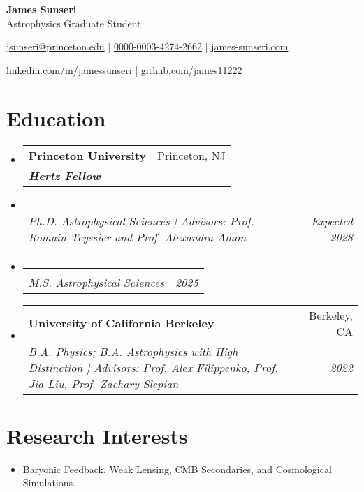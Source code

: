 \documentclass[letterpaper,10pt]{article}
\makeatletter
\newcommand{\resumeItemSimple}[2]{
  \item\small{
    \textbf{#1}{#2 \vspace{-3pt}}
  }
}
\newcommand{\resumeSubheading}[4]{
  \vspace{-1pt}\item[]
  \begin{tabular*}{0.98\textwidth}{l@{\extracolsep{\fill}}r}
      \hspace{-10pt}\textbf{#1} & #2 \\
      \hspace{-10pt}\textit{\small#3} & \textit{\small #4} \\
    \end{tabular*}\vspace{-3pt}
}
\newcommand{\resumeSubHeadingListStart}{\begin{itemize}[leftmargin=*]}
\newcommand{\resumeSubHeadingListEnd}{\end{itemize}}
\newcommand{\resumeItemListStart}{\begin{itemize}}
\newcommand{\shorterSection}[1]{\vspace{-10pt}\section{#1}}
\newcommand{\LinkedinLogo}{\textcolor{rgb:red,6;green,108;blue,170}{\faLinkedinSquare}}
\makeatother
\begin{document}
\begin{center}
  \textbf{\huge James Sunseri} \\ \vspace{0.07in} 
  {\Large Astrophysics Graduate Student} \\ \vspace{0.05in} 
  


  {\normalsize \faSendO \hspace{0pt} \href{href="mailto:jsunseri@princeton.edu"}{jsunseri@princeton.edu} | {\Large {}} \hspace{-2pt} \href{https://orcid.org/0000-0003-4274-2662/}{0000-0003-4274-2662} | \faUser \hspace{0 pt} \href{https://www.james-sunseri.com}{james-sunseri.com} \par \vspace{0.05in} \LinkedinLogo \hspace{0pt} \href{https://www.linkedin.com/in/jamessunseri}{linkedin.com/in/jamessunseri} | \faGithubSquare \hspace{0pt} \href{https://github.com/james11222}{github.com/james11222}}
\end{center}

\shorterSection{Education}
  \resumeSubHeadingListStart
    \resumeSubheading
      {Princeton University}{Princeton, NJ}
      {\textbf{Hertz Fellow}}{}{
    }
    \vspace{-20pt}
    \resumeSubheading
    {}{}{Ph.D. Astrophysical Sciences | Advisors: Prof. Romain Teyssier and Prof. Alexandra Amon}{Expected 2028}{
    }
    \vspace{-20pt}
    \resumeSubheading
    {}{}{M.S. Astrophysical Sciences }{2025}{
    }
    \resumeSubheading
      {University of California Berkeley}{Berkeley, CA}
      {B.A. Physics; B.A. Astrophysics with High Distinction | Advisors: Prof. Alex Filippenko, Prof. Jia Liu, Prof. Zachary Slepian}{2022}{
    }

  \resumeSubHeadingListEnd
  
 
\shorterSection{Research Interests}

\resumeItemListStart
\resumeItemSimple{}{Baryonic Feedback, Weak Lensing, CMB Secondaries, and Cosmological Simulations.}
\resumeSubHeadingListEnd
\end{document}
